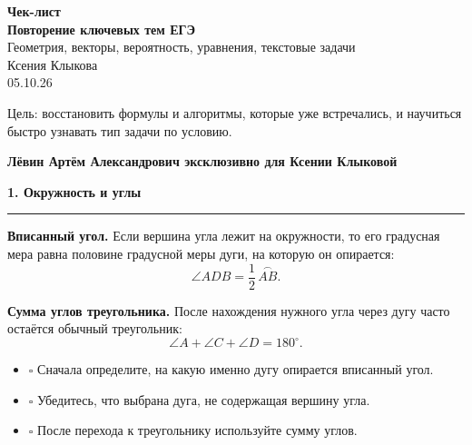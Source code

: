 \documentclass[a4paper,12pt]{article}
\newcommand{\topic}[1]{%
  \Needspace{8\baselineskip}%
  \vspace{0.6em}
  {\Large\bfseries\color{darkaccent}#1}\par
  \vspace{0.25em}
  {\color{accent}\rule{\linewidth}{0.6pt}}\par
  \vspace{0.3em}
}
\newcommand{\key}[1]{\textbf{\color{darkaccent}#1}}
\newcommand{\checkitem}{\(\square\)}
\renewcommand{\today}{05.10.26}
\begin{document}
\thispagestyle{empty}
\vspace*{24mm}
\begin{center}
  {\fontsize{30}{34}\selectfont\bfseries\color{darkaccent} Чек-лист}\\[4mm]
  {\fontsize{21}{25}\selectfont\bfseries Повторение ключевых тем ЕГЭ}\\[8mm]
  {\Large Геометрия, векторы, вероятность, уравнения, текстовые задачи}\\[15mm]

  {\large Ксения Клыкова}\\[3mm]
  {\large \today}\\[18mm]

  \begin{minipage}{0.78\textwidth}
  \centering
  \color{textgray}
  Цель: восстановить формулы и алгоритмы, которые уже встречались,
  и научиться быстро узнавать тип задачи по условию.
  \end{minipage}
\end{center}

\vfill

\begin{center}
{\large\bfseries\color{darkaccent}Лёвин Артём Александрович эксклюзивно для Ксении Клыковой}
\end{center}

\vspace{8mm}

\clearpage

\topic{1. Окружность и углы}

\key{Вписанный угол.}
Если вершина угла лежит на окружности, то его градусная мера равна половине градусной меры дуги, на которую он опирается:
\[
\angle ADB=\frac12\,\overset{\frown}{AB}.
\]

\key{Сумма углов треугольника.}
После нахождения нужного угла через дугу часто остаётся обычный треугольник:
\[
\angle A+\angle C+\angle D=180^\circ.
\]

\begin{itemize}
  \item \checkitem{} Сначала определите, на какую именно дугу опирается вписанный угол.
  \item \checkitem{} Убедитесь, что выбрана дуга, не содержащая вершину угла.
  \item \checkitem{} После перехода к треугольнику используйте сумму углов.
\end{itemize}
\end{document}
